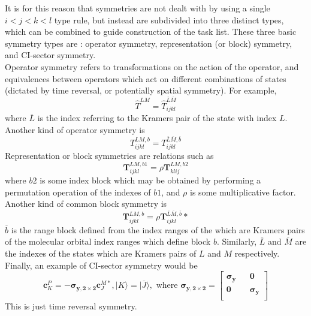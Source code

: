 \noindent It is for this reason that symmetries are not dealt with by using a
single $i<j<k<l$ type rule, but instead are subdivided into three distinct
types, which can be combined to guide construction of the task list. These
three basic symmetry types are : operator symmetry, representation (or block)
symmetry, and CI-sector symmetry.\\ 

\noindent Operator symmetry refers to transformations on the action of the
operator, and equivalences between operators which act on different
combinations of states (dictated by time reversal, or potentially spatial
symmetry). For example,
\begin{equation}
\hat{T}^{LM} = \hat{T}^{\overline{L}\overline{M}}_{ijkl} 
\end{equation}
\noindent where $\overline{L}$ is the index referring to the Kramers pair of the state with index $L$.
Another kind of operator symmetry is
\begin{equation}
T^{LM, b}_{ijkl} = T^{\overline{L}\overline{M}, \overline{b}}_{ijkl} 
\end{equation}
Representation or block symmetries are relations such as 
\begin{equation}
\mathbf{T}^{LM, b1}_{ijkl} = \rho \mathbf{T}^{LM, b2}_{klij} 
\end{equation}
where $b2$ is some index block which may be obtained by performing a
permutation operation of the indexes of $b1$, and $\rho$ is some multiplicative factor.
Another kind of common block symmetry is
\begin{equation}
\mathbf{T}^{LM, b}_{ijkl} = \rho \mathbf{T}^{\overline{L}\overline{M}, \overline{b}}_{ijkl}* 
\end{equation}
$\overline{b}$ is the range
block defined from the index ranges of the which are Kramers pairs of the
molecular orbital index ranges which define block $b$. Similarly, $\overline{L}$
and  $\overline{M}$ are the indexes of the states which are Kramers pairs of
$L$ and $M$ respectively.\\

\noindent Finally, an example of CI-sector symmetry would be
\begin{equation*} 
\mathbf{c}_{K}^{P} =  -\boldsymbol{\sigma_{y,2\times 2}}\mathbf{c}_{J}^{M*}, 
|K\rangle =  |\overline{J}\rangle, 
\text{ \ \ \ where  \ \ \ } 
\boldsymbol{\sigma_{y,2\times 2}} = 
\begin{bmatrix}
\boldsymbol{\sigma_{y}} && \mathbf{0} \\ 
\mathbf{0} && \boldsymbol{\sigma_{y}} \\
\end{bmatrix}
\end{equation*}
\noindent This is just time reversal symmetry.\\

